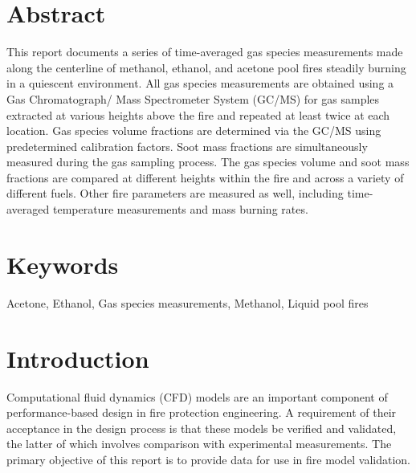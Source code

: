 \documentclass[12pt]{article}
\begin{document}
\section*{Abstract}
This report documents a series of time-averaged gas species measurements made along the centerline of methanol, ethanol, and acetone pool fires steadily burning in a quiescent environment. All gas species measurements are obtained using a Gas Chromatograph/ Mass Spectrometer System (GC/MS) for gas samples extracted at various heights above the fire and repeated at least twice at each location. Gas species volume fractions are determined via the GC/MS using predetermined calibration factors. Soot mass fractions are simultaneously measured during the gas sampling process. The gas species volume and soot mass fractions are compared at different heights within the fire and across a variety of different fuels. Other fire parameters are measured as well, including time-averaged temperature measurements and mass burning rates.
\section*{Keywords}
\normalsize Acetone, Ethanol, Gas species measurements, Methanol, Liquid pool fires \\
\pagebreak

\tableofcontents
	
\pagebreak

\listoftables
\pagebreak
\listoffigures

\clearpage
\section{Introduction}
\label{sec:intro}
Computational fluid dynamics (CFD) models are an important component of performance-based design in fire protection engineering. A requirement of their acceptance in the design process is that these models be verified and validated, the latter of which involves comparison with experimental measurements. The primary objective of this report is to provide data for use in fire model validation.
\end{document}
